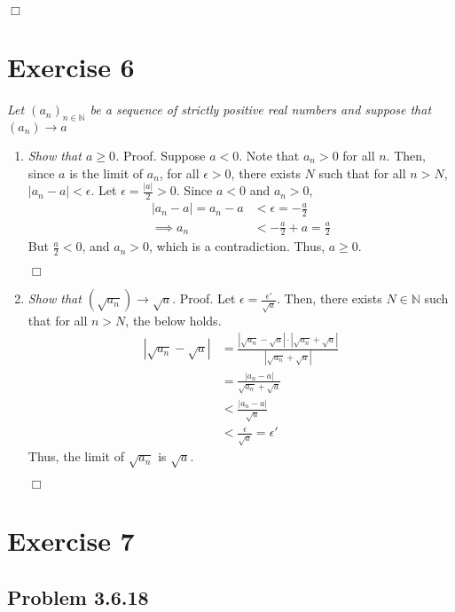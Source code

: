\documentclass[
]{article}
\begin{document}
\hfill \(\Box\)

\hypertarget{exercise-6}{%
\section{Exercise 6}\label{exercise-6}}

\textit{Let $(a_n)_{n \in \mathbb{N}}$ be a sequence of strictly positive real numbers and suppose that $(a_n)\to a$}

\begin{enumerate}
\item \textit{Show that $a \geq 0$.}  
Proof. Suppose $a < 0$. Note that $a_n > 0$ for all $n$. Then, since $a$ is the limit of $a_n$, for all $\epsilon > 0$, there exists $N$ such that for all $n > N$, $|a_n - a| < \epsilon$. Let $\epsilon = \frac{|a|}{2} > 0$. Since $a < 0$ and $a_n > 0$,
\[\begin{aligned}|a_n - a| = a_n - a &< \epsilon = -\frac{a}{2} \\
\implies a_n &< -\frac{a}{2} + a = \frac{a}{2}\end{aligned}\]
But $\frac{a}{2} < 0$, and $a_n > 0$, which is a contradiction. Thus, $a \geq 0$.  
  
\hfill $\Box$  
\item \textit{Show that $(\sqrt {a_n}) \to \sqrt{a}$}.  
Proof. Let $\epsilon = \frac{\epsilon'}{\sqrt a}$. Then, there exists $N \in \mathbb{N}$ such that for all $n > N$, the below holds.  
\[\begin{aligned} 
|\sqrt{a_n} - \sqrt a|
&= \frac{|\sqrt{a_n} - \sqrt a| \cdot |\sqrt{a_n} + \sqrt a|}{|\sqrt{a_n} + \sqrt a|} \\
&= \frac{|a_n - a|}{\sqrt{a_n} + \sqrt a} \\
&<\frac{|a_n - a|}{\sqrt a} \\
&< \frac{\epsilon}{\sqrt a} = \epsilon'
\end{aligned}\]
Thus, the limit of $\sqrt {a_n}$ is $\sqrt{a}$. 

\hfill $\Box$ 
\end{enumerate}

\hypertarget{exercise-7}{%
\section{Exercise 7}\label{exercise-7}}

\hypertarget{problem-3.6.18}{%
\subsection{Problem 3.6.18}\label{problem-3.6.18}}
\end{document}
